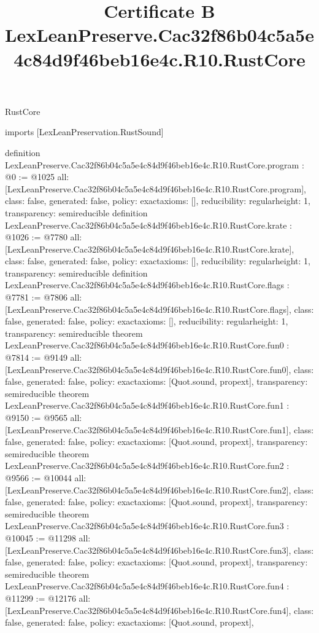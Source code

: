 \begin{lexlean}{RustCore}
\title{Certificate B LexLeanPreserve.Cac32f86b04c5a5e4c84d9f46beb16e4c.R10.RustCore}
\begin{coremodule}
imports [LexLeanPreservation.RustSound]

definition LexLeanPreserve.Cac32f86b04c5a5e4c84d9f46beb16e4c.R10.RustCore.program : @0 := @1025 {
  all: [LexLeanPreserve.Cac32f86b04c5a5e4c84d9f46beb16e4c.R10.RustCore.program],
  class: false,
  generated: false,
  policy: exact{axioms: []},
  reducibility: regular{height: 1},
  transparency: semireducible
}
definition LexLeanPreserve.Cac32f86b04c5a5e4c84d9f46beb16e4c.R10.RustCore.krate : @1026 := @7780 {
  all: [LexLeanPreserve.Cac32f86b04c5a5e4c84d9f46beb16e4c.R10.RustCore.krate],
  class: false,
  generated: false,
  policy: exact{axioms: []},
  reducibility: regular{height: 1},
  transparency: semireducible
}
definition LexLeanPreserve.Cac32f86b04c5a5e4c84d9f46beb16e4c.R10.RustCore.flags : @7781 := @7806 {
  all: [LexLeanPreserve.Cac32f86b04c5a5e4c84d9f46beb16e4c.R10.RustCore.flags],
  class: false,
  generated: false,
  policy: exact{axioms: []},
  reducibility: regular{height: 1},
  transparency: semireducible
}
theorem LexLeanPreserve.Cac32f86b04c5a5e4c84d9f46beb16e4c.R10.RustCore.fun0 : @7814 := @9149 {
  all: [LexLeanPreserve.Cac32f86b04c5a5e4c84d9f46beb16e4c.R10.RustCore.fun0],
  class: false,
  generated: false,
  policy: exact{axioms: [Quot.sound, propext]},
  transparency: semireducible
}
theorem LexLeanPreserve.Cac32f86b04c5a5e4c84d9f46beb16e4c.R10.RustCore.fun1 : @9150 := @9565 {
  all: [LexLeanPreserve.Cac32f86b04c5a5e4c84d9f46beb16e4c.R10.RustCore.fun1],
  class: false,
  generated: false,
  policy: exact{axioms: [Quot.sound, propext]},
  transparency: semireducible
}
theorem LexLeanPreserve.Cac32f86b04c5a5e4c84d9f46beb16e4c.R10.RustCore.fun2 : @9566 := @10044 {
  all: [LexLeanPreserve.Cac32f86b04c5a5e4c84d9f46beb16e4c.R10.RustCore.fun2],
  class: false,
  generated: false,
  policy: exact{axioms: [Quot.sound, propext]},
  transparency: semireducible
}
theorem LexLeanPreserve.Cac32f86b04c5a5e4c84d9f46beb16e4c.R10.RustCore.fun3 : @10045 := @11298 {
  all: [LexLeanPreserve.Cac32f86b04c5a5e4c84d9f46beb16e4c.R10.RustCore.fun3],
  class: false,
  generated: false,
  policy: exact{axioms: [Quot.sound, propext]},
  transparency: semireducible
}
theorem LexLeanPreserve.Cac32f86b04c5a5e4c84d9f46beb16e4c.R10.RustCore.fun4 : @11299 := @12176 {
  all: [LexLeanPreserve.Cac32f86b04c5a5e4c84d9f46beb16e4c.R10.RustCore.fun4],
  class: false,
  generated: false,
  policy: exact{axioms: [Quot.sound, propext]},
}
\end{coremodule}
\end{lexlean}
